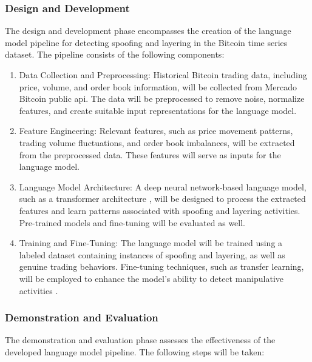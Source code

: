 \subsubsection{Design and Development}
The design and development phase encompasses the creation of the language model pipeline for detecting spoofing and
layering in the Bitcoin time series dataset. The pipeline consists of the following components:

\begin{enumerate}
    \item Data Collection and Preprocessing: Historical Bitcoin trading data, including price, volume, and order book
    information, will be collected from Mercado Bitcoin public api. The data will be preprocessed to remove noise,
    normalize features, and create suitable input representations for the language model.
    \item Feature Engineering: Relevant features, such as price movement patterns, trading volume fluctuations, and
    order book imbalances, will be extracted from the preprocessed data. These features will serve as inputs for the
    language model.
    \item Language Model Architecture: A deep neural network-based language model, such as a transformer architecture
    \cite{vaswani2017attention}, will be designed to process the extracted features and learn patterns associated with
    spoofing and layering activities. Pre-trained models and fine-tuning will be evaluated as well.
    \item Training and Fine-Tuning: The language model will be trained using a labeled dataset containing instances of
    spoofing and layering, as well as genuine trading behaviors. Fine-tuning techniques, such as transfer learning, will
    be employed to enhance the model's ability to detect manipulative activities \cite{howard2018universal}.
\end{enumerate}

\subsubsection{Demonstration and Evaluation}
The demonstration and evaluation phase assesses the effectiveness of the developed language model pipeline. The
following steps will be taken:

